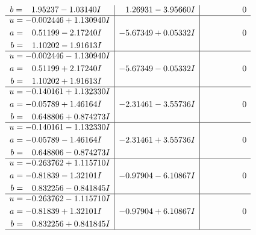 \documentclass[1p]{elsarticle_modified}
\theoremstyle{definition}
\begin{document}
$$\begin{array}{c|c|c}
\begin{aligned}
b &= \phantom{-}1.95237 - 1.03140 I\end{aligned}
 & \phantom{-}1.26931 - 3.95660 I & \phantom{-0.000000 } 0 \\ \hline\begin{aligned}
u &= -0.002446 + 1.130940 I \\
a &= \phantom{-}0.51199 - 2.17240 I \\
b &= \phantom{-}1.10202 - 1.91613 I\end{aligned}
 & -5.67349 + 0.05332 I & \phantom{-0.000000 } 0 \\ \hline\begin{aligned}
u &= -0.002446 - 1.130940 I \\
a &= \phantom{-}0.51199 + 2.17240 I \\
b &= \phantom{-}1.10202 + 1.91613 I\end{aligned}
 & -5.67349 - 0.05332 I & \phantom{-0.000000 } 0 \\ \hline\begin{aligned}
u &= -0.140161 + 1.132330 I \\
a &= -0.05789 + 1.46164 I \\
b &= \phantom{-}0.648806 + 0.874273 I\end{aligned}
 & -2.31461 - 3.55736 I & \phantom{-0.000000 } 0 \\ \hline\begin{aligned}
u &= -0.140161 - 1.132330 I \\
a &= -0.05789 - 1.46164 I \\
b &= \phantom{-}0.648806 - 0.874273 I\end{aligned}
 & -2.31461 + 3.55736 I & \phantom{-0.000000 } 0 \\ \hline\begin{aligned}
u &= -0.263762 + 1.115710 I \\
a &= -0.81839 - 1.32101 I \\
b &= \phantom{-}0.832256 - 0.841845 I\end{aligned}
 & -0.97904 - 6.10867 I & \phantom{-0.000000 } 0 \\ \hline\begin{aligned}
u &= -0.263762 - 1.115710 I \\
a &= -0.81839 + 1.32101 I \\
b &= \phantom{-}0.832256 + 0.841845 I\end{aligned}
 & -0.97904 + 6.10867 I & \phantom{-0.000000 } 0\\
 \hline 
 \end{array}$$\newpage$$\begin{array}{c|c|c}  

\end{array}$$
\end{document}
